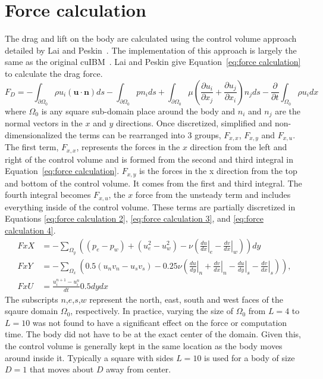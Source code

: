 \section{Force calculation}
\label{Force Calculation}

The drag and lift on the body are calculated using the control volume approach detailed by Lai and Peskin~\cite{lai2000immersed}.
The implementation of this approach is largely the same as the original cuIBM~\cite{layton2011cuibm}. 
Lai and Peskin give Equation~\eqref{eq:force calculation} to calculate the drag force. 
\begin{equation}\label{eq:force calculation}
F_D=-\int_{\partial \Omega_0} \rho u_i(\textbf{u}\cdot \textbf{n})ds- \int_{\partial \Omega_0}pn_ids+\int_{\partial \Omega_0}\mu \left(\frac{\partial u_i}{\partial x_j}+\frac{\partial u_j}{\partial x_i}\right)n_jds-\frac{\partial}{\partial t}\int_{\Omega_0}\rho u_i dx
\end{equation}
where $\Omega_0$ is any square sub-domain place around the body and $n_i$ and $n_j$ are the normal vectors in the $x$ and $y$ directions. 
Once discretized, simplified and non-dimensionalized the terms can be rearranged into 3 groups, $F_{x,x}$, $F_{x,y}$ and $F_{x,u}$. 
The first term, $F_{x,x}$, represents the forces in the $x$ direction from the left and right of the control volume and is formed from the second and third integral in Equation~\eqref{eq:force calculation}. 
$F_{x,y}$ is the forces in the x direction from the top and bottom of the control volume. 
It comes from the first and third integral. 
The fourth integral becomes $F_{x,u}$, the $x$ force from the unsteady term and includes everything inside of the control volume. 
These terms are partially discretized in Equations \eqref{eq:force calculation 2}, \eqref{eq:force calculation 3}, and \eqref{eq:force calculation 4}. 
\begin{align}
FxX &=-\sum_{\Omega_y}\left((p_e-p_w)+(u_e^2-u_w^2)-\nu\left(\left.\frac{du}{dx}\right|_e-\left.\frac{dv}{dx}\right|_w\right)\right)dy\label{eq:force calculation 2}\\
FxY &=-\sum_{\Omega_x}\left(0.5(u_nv_n-u_sv_s)-0.25\nu \left(\left.\frac{du}{dy}\right|_n+\left.\frac{dv}{dx}\right|_n-\left.\frac{du}{dy}\right|_s-\left.\frac{dv}{dx}\right|_s\right)\right),\label{eq:force calculation 3}\\
FxU &=\frac{u_i^{n+1}-u_i^{n}}{dt}0.5dydx\;\label{eq:force calculation 4}
\end{align}
The subscripts $n$,$e$,$s$,$w$ represent the north, east, south and west faces of the sqaure domain $\Omega_0$, respectively.
In practice, varying the size of $\Omega_0$ from $L=4$ to $L=10$ was not found to have a significant effect on the force or computation time.
The body did not have to be at the exact center of the domain.
Given this, the control volume is generally kept in the same location as the body moves around inside it.
Typically a square with sides $L=10$ is used for a body of size $D=1$ that moves about $D$ away from center.

